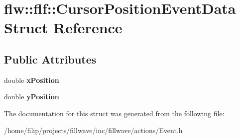 \hypertarget{structflw_1_1flf_1_1CursorPositionEventData}{}\section{flw\+:\+:flf\+:\+:Cursor\+Position\+Event\+Data Struct Reference}
\label{structflw_1_1flf_1_1CursorPositionEventData}
\subsection*{Public Attributes}
\begin{DoxyCompactItemize}
\item 
\mbox{\label{structflw_1_1flf_1_1CursorPositionEventData_a81d94727e5940bfab91223fa48332df0}} 
double {\bfseries x\+Position}
\item 
\mbox{\label{structflw_1_1flf_1_1CursorPositionEventData_ad0a614b6aea762878ba9328fb56739e5}} 
double {\bfseries y\+Position}
\end{DoxyCompactItemize}


The documentation for this struct was generated from the following file\+:\begin{DoxyCompactItemize}
\item 
/home/filip/projects/fillwave/inc/fillwave/actions/Event.\+h\end{DoxyCompactItemize}
